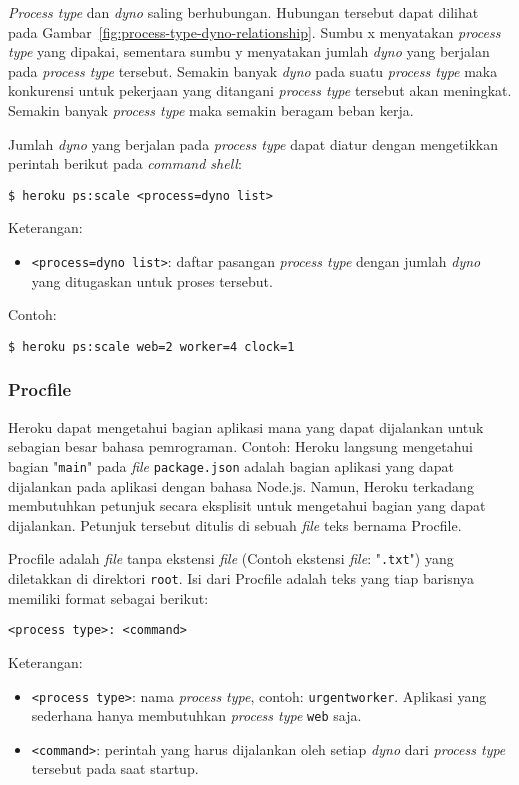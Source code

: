 \textit{Process type} dan \textit{dyno} saling berhubungan. Hubungan tersebut dapat dilihat pada Gambar~\ref{fig:process-type-dyno-relationship}. Sumbu x menyatakan \textit{process type} yang dipakai, sementara sumbu y menyatakan jumlah \textit{dyno} yang berjalan pada \textit{process type} tersebut. Semakin banyak \textit{dyno} pada suatu \textit{process type} maka konkurensi untuk pekerjaan yang ditangani \textit{process type} tersebut akan meningkat. Semakin banyak \textit{process type} maka semakin beragam beban kerja.

Jumlah \textit{dyno} yang berjalan pada \textit{process type} dapat diatur dengan mengetikkan perintah berikut pada \textit{command shell}:
\begin{lstlisting}
$ heroku ps:scale <process=dyno list>
\end{lstlisting}
Keterangan:
\begin{itemize}
\item \texttt{<process=dyno list>}: daftar pasangan \textit{process type} dengan jumlah \textit{dyno} yang ditugaskan untuk proses tersebut.
\end{itemize}

Contoh: 
\begin{lstlisting}
$ heroku ps:scale web=2 worker=4 clock=1
\end{lstlisting}

\subsubsection{Procfile}
Heroku dapat mengetahui bagian aplikasi mana yang dapat dijalankan untuk sebagian besar bahasa pemrograman. Contoh: Heroku langsung mengetahui bagian "\texttt{main}" pada \textit{file} \texttt{package.json} adalah bagian aplikasi yang dapat dijalankan pada aplikasi dengan bahasa Node.js. Namun, Heroku terkadang membutuhkan petunjuk secara eksplisit untuk mengetahui bagian yang dapat dijalankan. Petunjuk tersebut ditulis di sebuah \textit{file} teks bernama Procfile. 

Procfile adalah \textit{file} tanpa ekstensi \textit{file} (Contoh ekstensi \textit{file}: "\texttt{.txt}") yang diletakkan di direktori \texttt{root}. Isi dari Procfile adalah teks yang tiap barisnya memiliki format sebagai berikut:
\begin{lstlisting}
<process type>: <command>
\end{lstlisting}
Keterangan:
\begin{itemize}
\item \texttt{<process type>}: nama \textit{process type}, contoh: \texttt{urgentworker}. Aplikasi yang sederhana hanya membutuhkan \textit{process type} \texttt{web} saja.
\item \texttt{<command>}: perintah yang harus dijalankan oleh setiap \textit{dyno} dari \textit{process type} tersebut pada saat startup.
\end{itemize}


